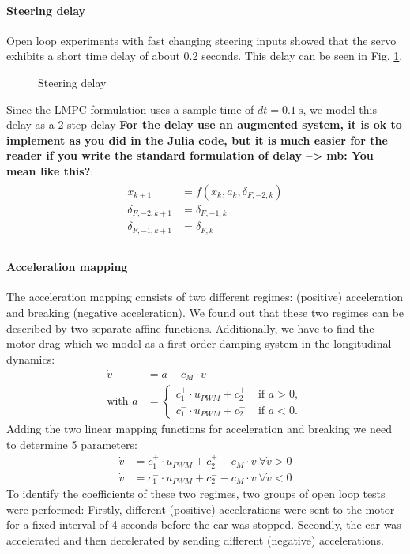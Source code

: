 \paragraph{Steering delay} Open loop experiments with fast changing steering inputs showed that the servo exhibits a short time delay of about 0.2 seconds. This delay can be seen in Fig. \ref{fig:d_f_delay}.
\begin{figure}[ht]
    \centering
      
    \caption{Steering delay}
    \label{fig:d_f_delay}
\end{figure}
Since the LMPC formulation uses a sample time of $dt=\SI{0.1}{\second}$, we model this delay as a 2-step delay {\bfseries{For the delay use an augmented system, it is ok to implement as you did in the Julia code, but it is much easier for the reader if you write the standard formulation of delay --> mb: You mean like this?}}:
\begin{align}
\begin{split}
x_{k+1}&=f(x_k,a_k,\delta_{F,-2,k})\\
\delta_{F,-2,k+1}&=\delta_{F,-1,k}\\
\delta_{F,-1,k+1}&=\delta_{F,k}\\
\end{split}
\end{align}
\paragraph{Acceleration mapping} The acceleration mapping consists of two different regimes: (positive) acceleration and breaking (negative acceleration). We found out that these two regimes can be described by two separate affine functions. Additionally, we have to find the motor drag which we model as a first order damping system in the longitudinal dynamics:
\begin{align}
\dot v &= a - c_M\cdot v\label{eq:longDyn}\\
\text{with } a&=\begin{cases}
c_{1}^+\cdot u_{PWM}+c_{2}^+ &\text{ if } a>0,\\
c_{1}^-\cdot u_{PWM}+c_{2}^- &\text{ if } a<0.
\end{cases}
\end{align}
Adding the two linear mapping functions for acceleration and breaking we need to determine 5 parameters:
\begin{subequations}
\begin{align}
\dot v &= c_{1}^+\cdot u_{PWM}+c_{2}^+ - c_M\cdot v\ \forall \dot v > 0\\
\dot v &= c_{1}^-\cdot u_{PWM}+c_{2}^- - c_M\cdot v\ \forall \dot v < 0
\end{align}
\end{subequations}
To identify the coefficients of these two regimes, two groups of open loop tests were performed: Firstly, different (positive) accelerations were sent to the motor for a fixed interval of 4 seconds before the car was stopped. Secondly, the car was accelerated and then decelerated by sending different (negative) accelerations.

